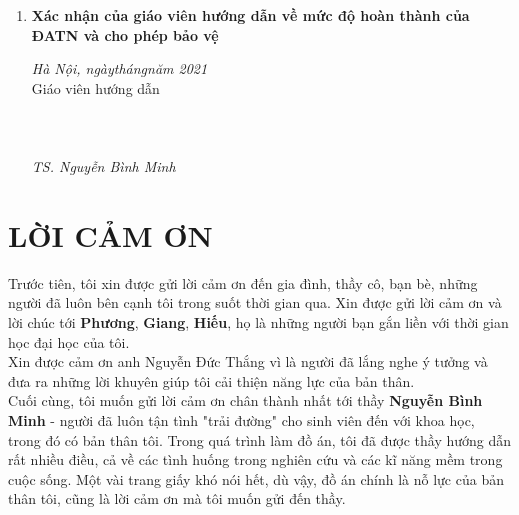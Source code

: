 \documentclass{my_style}
\begin{document}
\begin{enumerate}
\item \textbf{Xác nhận của giáo viên hướng dẫn về mức độ hoàn thành của ĐATN và cho phép bảo vệ }\\
\begin{adjustwidth}{200pt}{}
\begin{center}
\textit{Hà Nội, ngày\qquad tháng\qquad năm 2021}\\
Giáo viên hướng dẫn\\ 
\leavevmode\\
\leavevmode\\
\leavevmode\\
\textit{TS. Nguyễn Bình Minh}
\end{center}
\end{adjustwidth} 
\end{enumerate}

\newpage	
\section*{LỜI CẢM ƠN}	
Trước tiên, tôi xin được gửi lời cảm ơn đến gia đình, thầy cô, bạn bè, những người đã luôn bên cạnh tôi trong suốt thời gian qua. Xin được gửi lời cảm ơn và lời chúc tới \textbf{Phương}, \textbf{Giang}, \textbf{Hiếu}, họ là những người bạn gắn liền với thời gian học đại học của tôi.\\
Xin được cảm ơn anh Nguyễn Đức Thắng vì là người đã lắng nghe ý tưởng và đưa ra những lời khuyên giúp tôi cải thiện năng lực của bản thân.\\
Cuối cùng, tôi muốn gửi lời cảm ơn chân thành nhất tới thầy \textbf{Nguyễn Bình Minh} - người đã luôn tận tình "trải đường" cho sinh viên đến với khoa học, trong đó có bản thân tôi. Trong quá trình làm đồ án, tôi đã được thầy hướng dẫn rất nhiều điều, cả về các tình huống trong nghiên cứu và các kĩ năng mềm trong cuộc sống. Một vài trang giấy khó nói hết, dù vậy, đồ án chính là nỗ lực của bản thân tôi, cũng là lời cảm ơn mà tôi muốn gửi đến thầy. 
\end{document}
